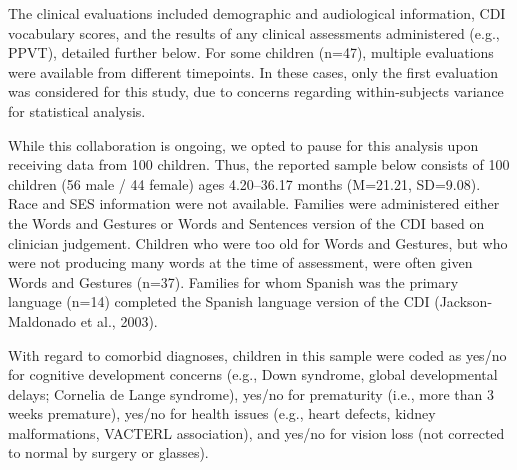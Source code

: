 \documentclass[english,man]{apa6}
\begin{document}
The clinical evaluations included demographic and audiological information, CDI vocabulary scores, and the results of any clinical assessments administered (e.g., PPVT), detailed further below. For some children (n=47), multiple evaluations were available from different timepoints. In these cases, only the first evaluation was considered for this study, due to concerns regarding within-subjects variance for statistical analysis.

While this collaboration is ongoing, we opted to pause for this analysis upon receiving data from 100 children. Thus, the reported sample below consists of 100 children (56 male / 44 female) ages 4.20--36.17 months (M=21.21, SD=9.08). Race and SES information were not available. Families were administered either the Words and Gestures or Words and Sentences version of the CDI based on clinician judgement. Children who were too old for Words and Gestures, but who were not producing many words at the time of assessment, were often given Words and Gestures (n=37). Families for whom Spanish was the primary language (n=14) completed the Spanish language version of the CDI (Jackson-Maldonado et al., 2003).

\begin{table}

\caption{\label{tab:CDIinfo}CDI details}
\centering
{}
\end{table}

With regard to comorbid diagnoses, children in this sample were coded as yes/no for cognitive development concerns (e.g., Down syndrome, global developmental delays; Cornelia de Lange syndrome), yes/no for prematurity (i.e., more than 3 weeks premature), yes/no for health issues (e.g., heart defects, kidney malformations, VACTERL association), and yes/no for vision loss (not corrected to normal by surgery or glasses).
\end{document}
